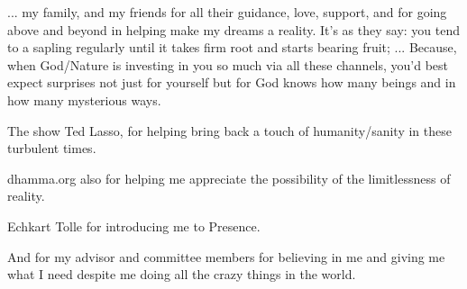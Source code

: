 ... my family, and my friends for all their guidance, love, support, and for going above and beyond in helping make my dreams a reality. It's as they say: you tend to a sapling regularly until it takes firm root and starts bearing fruit; ... Because, when God/Nature is investing in you so much via all these channels, you'd best expect surprises not just for yourself but for God knows how many beings and in how many mysterious ways.

The show Ted Lasso, for helping bring back a touch of humanity/sanity in these turbulent times.

dhamma.org also for helping me appreciate the possibility of the limitlessness of reality.

Echkart Tolle for introducing me to Presence.

And for my advisor and committee members for believing in me and giving me what I need despite me doing all the crazy things in the world.